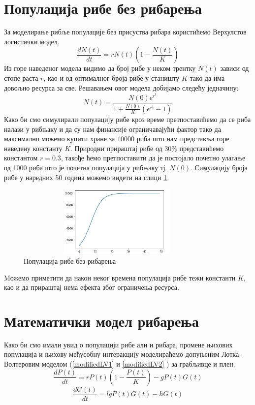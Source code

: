 \documentclass[a4paper]{article}
\begin{document}
{\section{Популација рибе без рибарења}
\label{sec:nofishing}
За моделирање рибље популације без присуства рибара користићемо Верхулстов логистички модел.
\begin{equation}
    \frac{dN(t)}{dt} = rN(t)\left(1-\frac{N(t)}{K}\right)
\end{equation}
Из горе наведеног модела видимо да број рибе у неком трентку $N(t)$ зависи од стопе раста $r$, као и од оптималног броја рибе у станишту $K $ тако да има довољно ресурса за све. Решавањем овог модела добијамо следећу једначину:
\begin{equation}
    N(t) = \frac{N(0)e^r^t}{1+\frac{N(0)}{K}(e^r^t - 1)}
\end{equation}
Како би смо симулирали популацију рибе кроз време претпоставићемо да се риба налази у рибњаку и да су нам финансије ограничавајући фактор тако да максимално можемо купити хране за $10000$ риба што нам представља горе наведену константу $K$. Природни прираштај рибе од 30\% представићемо константом $r=0.3$, такође ћемо претпоставити да је постојало почетно улагање од 1000 риба што је почетна популација у рибњаку тј. $N(0)$. Симулацију броја рибе у наредних 50 година можемо видети на слици \ref{fishnofishing_view}.
\begin{figure}[h!]
	\centering
	\includegraphics[width=10cm,height=3.5cm]{images/FishPopulationNoFishing.png}
	\caption{Популација рибе без рибарења}
	\label{fishnofishing_view}
\end{figure}
Mожемо приметити да након неког времена популација рибе тежи константи $K$, као и да прираштај нема ефекта због ограничења ресурса.

\section{Математички модел рибарења}
\label{sec:fishing}
Како би смо имали увид о популацији рибе али и рибара, промене њихових популација и њихову међусобну интеракцију моделираћемо допуњеним Лотка-Волтеровим моделом (\ref{modifiedLV1} и \ref{modifiedLV2} ) за грабљивце и плен.
\begin{equation}
    \label{modifiedLV1}
    \frac{dP(t)}{dt} = rP(t)\left(1-\frac{P(t)}{K}\right) - gP(t)G(t)
\end{equation}
\begin{equation}
    \label{modifiedLV2}
    \frac{dG(t)}{dt} = lgP(t)G(t) - hG(t)
\end{equation}

}
\end{document}
